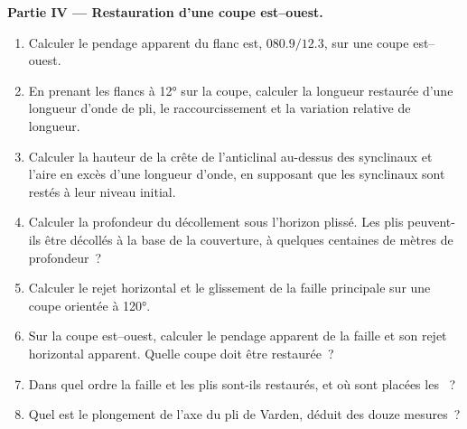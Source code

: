 \begin{problem}
\medskip\noindent\textbf{Partie IV --- Restauration d'une coupe est--ouest.}
\begin{enumerate}[resume]
  \item Calculer le pendage apparent du flanc est, $080.9/12.3$, sur une
        coupe est--ouest.
  \item En prenant les flancs à \ang{12} sur la coupe, calculer la longueur restaurée
        d'une longueur d'onde de pli, le raccourcissement et la variation relative
        de longueur.
  \item Calculer la hauteur de la crête de l'anticlinal au-dessus des synclinaux et
        l'aire en excès d'une longueur d'onde, en supposant que les synclinaux sont restés à
        leur niveau initial.
  \item Calculer la profondeur du décollement sous l'horizon plissé. Les plis peuvent-ils
        être décollés à la base de la couverture, à quelques centaines de mètres
        de profondeur~?
  \item Calculer le rejet horizontal et le glissement de la faille principale sur une coupe orientée
        à \ang{120}.
  \item Sur la coupe est--ouest, calculer le pendage apparent de la faille et
        son rejet horizontal apparent. Quelle coupe doit être restaurée~?
  \item Dans quel ordre la faille et les plis sont-ils restaurés, et où sont placées les
        ~?
  \item Quel est le plongement de l'axe du pli de Varden, déduit des douze
        mesures~?
\end{enumerate}
\end{problem}
